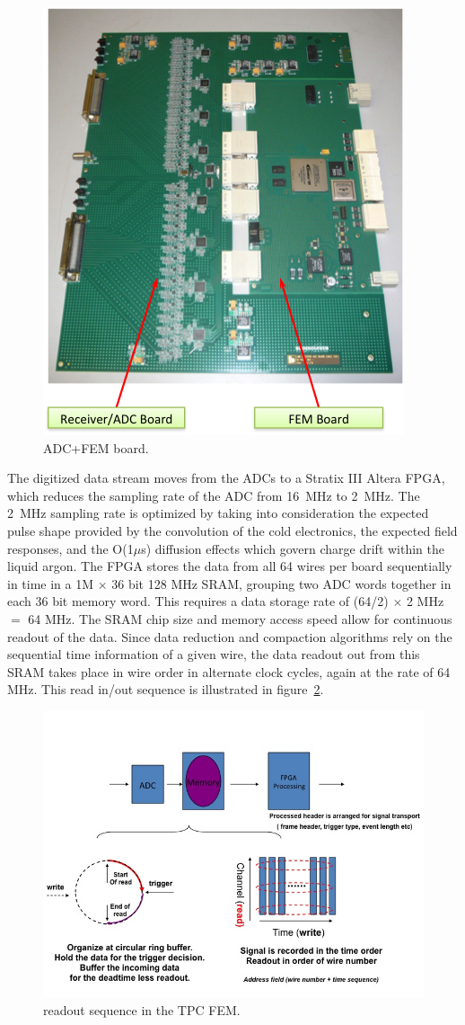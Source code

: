 \begin{figure}
\centering
\includegraphics[width=0.6\linewidth]{./figures/readout_2.png}%
\caption{\label{fig:readout_2}\lartpc ADC+FEM board.}
\end{figure}

The digitized data stream moves from the ADCs to a Stratix III Altera FPGA, which reduces the sampling rate of the ADC from 16~MHz to 2~MHz. The 2~MHz sampling rate is optimized by taking into consideration the expected pulse shape provided by the convolution of the cold electronics, the expected \lartpc field responses, and the O(1$\mu$s) diffusion effects which govern charge drift within the liquid argon. The FPGA stores the data from all 64 wires per board sequentially in time in a 1M $\times$ 36 bit 128 MHz SRAM, grouping two ADC words together in each 36 bit memory word. This requires a data storage rate of (64/2) $\times$ 2 MHz $=$ 64 MHz.  The SRAM chip size and memory access speed allow for continuous readout of the \lartpc data. Since data reduction and compaction algorithms rely on the sequential time information of a given wire, the data readout out from this SRAM takes place in wire order in alternate clock cycles, again at the rate of 64 MHz. This read in/out sequence is illustrated in figure~\ref{fig:readout_3}.

\begin{figure}
\centering
\includegraphics[width=0.8\linewidth]{./figures/readout_3.jpg}%
\caption{\label{fig:readout_3}\lartpc readout sequence in the TPC FEM.}
\end{figure}

